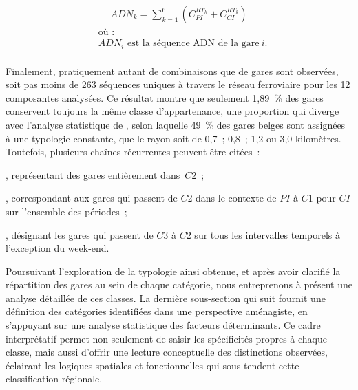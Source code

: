 \begin{refsegment}
\begin{equation}
\label{equation:sequence-adn}
\begin{aligned}
ADN_k = \sum_{k=1}^{6} \left( C^{RT_k}_{PI} + C^{RT_k}_{CI} \right)
\end{aligned}
\end{equation}
\begin{align*}
    &\text{où~:} \\
    &ADN_i \text{ est la séquence ADN de la gare}~i\text{.}\\
\end{align*}%

Finalement, pratiquement autant de combinaisons que de gares sont observées, soit pas moins de 263 séquences uniques à travers le réseau ferroviaire pour les 12 composantes analysées. Ce résultat montre que seulement 1,89~\% des gares conservent toujours la même classe d'appartenance, une proportion qui diverge avec l'analyse statistique de \textcolor{blue}{\textcite[518]{caset_measuring_2018}}, selon laquelle 49~\% des gares belges sont assignées à une typologie constante, que le rayon soit de 0,7~; 0,8~; 1,2 ou 3,0 kilomètres. Toutefois, plusieurs chaînes récurrentes peuvent être citées~: 
\begin{customitemize}
    \item {}, représentant des gares entièrement dans~\(C2\)~;
    \item {}, correspondant aux gares qui passent de \(C2\) dans le contexte de \(PI\) à \(C1\) pour \(CI\) sur l'ensemble des périodes~;
    \item {}, désignant les gares qui passent de \(C3\) à \(C2\) sur tous les intervalles temporels à l'exception du week-end.
\end{customitemize}%

Poursuivant l'exploration de la typologie ainsi obtenue, et après avoir clarifié la répartition des gares au sein de chaque catégorie, nous entreprenons à présent une analyse détaillée de ces classes. La dernière sous-section qui suit fournit une définition des catégories identifiées dans une perspective aménagiste, en s’appuyant sur une analyse statistique des facteurs déterminants. Ce cadre interprétatif permet non seulement de saisir les spécificités propres à chaque classe, mais aussi d'offrir une lecture conceptuelle des distinctions observées, éclairant les logiques spatiales et fonctionnelles qui sous-tendent cette classification régionale.%


\end{refsegment}
